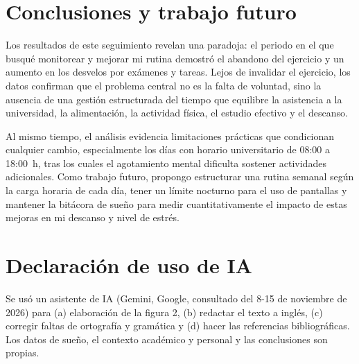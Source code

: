 \documentclass[conference]{IEEEtran}
\begin{document}
\section{Conclusiones y trabajo futuro}
Los resultados de este seguimiento revelan una paradoja: el periodo en el que busqué monitorear y mejorar mi rutina demostró el abandono del ejercicio y un aumento en los desvelos por exámenes y tareas. Lejos de invalidar el ejercicio, los datos confirman que el problema central no es la falta de voluntad, sino la ausencia de una gestión estructurada del tiempo que equilibre la asistencia a la universidad, la alimentación, la actividad física, el estudio efectivo y el descanso.

Al mismo tiempo, el análisis evidencia limitaciones prácticas que condicionan cualquier cambio, especialmente los días con horario universitario de 08:00 a 18:00~h, tras los cuales el agotamiento mental dificulta sostener actividades adicionales. Como trabajo futuro, propongo estructurar una rutina semanal según la carga horaria de cada día, tener un límite nocturno para el uso de pantallas y mantener la bitácora de sueño para medir cuantitativamente el impacto de estas mejoras en mi descanso y nivel de estrés.

\section*{Declaración de uso de IA}
Se usó un asistente de IA (Gemini, Google, consultado del 8-15 de noviembre de 2026) para (a) elaboración de la figura 2, (b) redactar el texto a inglés, (c) corregir faltas de ortografía y gramática y (d) hacer las referencias bibliográficas. Los datos de sueño, el contexto académico y personal y las conclusiones son propias.
\end{document}
